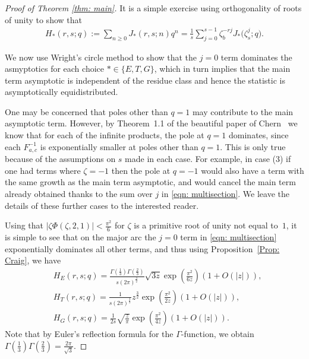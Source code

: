 \documentclass[10pt,a4paper]{amsart}
\numberwithin{equation}{section}
\begin{document}
\begin{proof}[Proof of Theorem \ref{thm: main}]
It is a simple exercise using orthogonality of roots of unity to show that
\begin{align}\label{eqn: multisection}
H_*(r,s;q) := \sum_{n \geq 0} J_*(r,s;n) q^n = \frac{1}{s} \sum_{j=0}^{s-1} \zeta_b^{-rj} J_*\big(\zeta_s^j;q\big).
\end{align}

We now use Wright's circle method to show that the $j=0$ term dominates the asmyptotics for each choice $* \in \{ E,T,G \}$, which in turn implies that the main term asymptotic is independent of the residue class and hence the statistic is asymptotically equidistributed.

One may be concerned that poles other than $q=1$ may contribute to the main asymptotic term. However, by Theorem~1.1 of the beautiful paper of Chern~\cite{Chern} we know that for each of the infinite products, the pole at $q=1$ dominates, since each $F_{a,c}^{-1}$ is exponentially smaller at poles other than $q=1$. This is only true because of the assumptions on $s$ made in each case. For example, in case (3) if one had terms where $\zeta = -1$ then the pole at $q =-1$ would also have a term with the same growth as the main term asymptotic, and would cancel the main term already obtained thanks to the sum over $j$ in \eqref{eqn: multisection}. We leave the details of these further cases to the interested reader.


Using that $\lvert \zeta \Phi(\zeta,2,1) \rvert < \frac{\pi^2}{6}$ for $\zeta$ is a primitive root of unity not equal to~$1$, it is simple to see that on the major arc the $j=0$ term in \eqref{eqn: multisection} exponentially dominates all other terms, and thus using Proposition~\ref{Prop: Craig}, we have
\begin{align*}
		&H_E(r,s;q) = \frac{\Gamma\left(\frac{1}{3}\right) \Gamma\left(\frac{2}{3}\right)}{s (2\pi)^{\frac{3}{2}}} \sqrt{3z} \exp\left( \frac{\pi^2}{6z} \right) \left(1+O(|z|)\right) , \\
	&H_T(r,s;q) = \frac{1}{s (2\pi)^{\frac{3}{2}}} z^{\frac{3}{2}} \exp\left(\frac{\pi^2}{2z}\right) \left(1+O(|z|)\right), \\
	&H_G(r,s;q) = \frac{1}{2s} \sqrt{\frac{z}{\pi}} \exp\left( \frac{\pi^2}{4z} \right)\left(1+O(|z|)\right).
\end{align*}
Note that by Euler's reflection formula for the $\Gamma$-function, we obtain $\Gamma\left(\frac{1}{3}\right) \Gamma\left(\frac{2}{3}\right) = \frac{2 \pi}{\sqrt{3}}$.



\end{proof}
\end{document}
